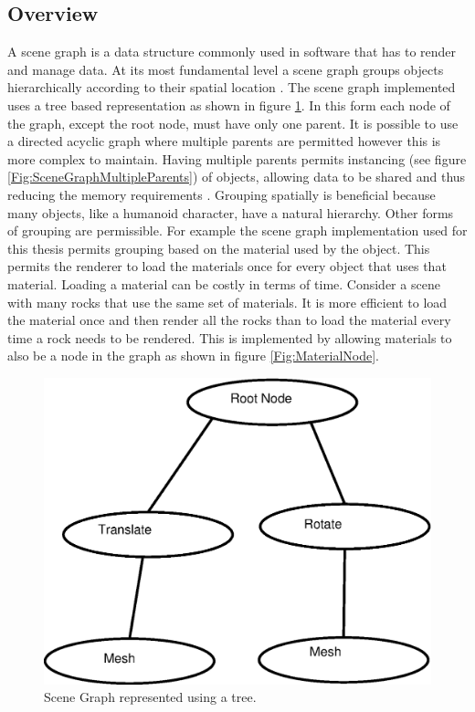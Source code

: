 \subsection{Overview}
A scene graph is a data structure commonly used in software that has to render
and manage data. At its most fundamental level a scene graph groups objects
hierarchically according to their spatial location \cite{Eberly}. The scene
graph implemented uses a tree based representation as shown in figure
\ref{Fig:SceneGraphTree}. In this form each node of the graph, except the root
node, must have only one parent. It is possible to use a directed acyclic graph
where multiple parents are permitted however this is more complex to maintain.
Having multiple parents permits instancing (see figure
\ref{Fig:SceneGraphMultipleParents}) of objects, allowing data to be
shared and thus reducing the memory requirements
\cite{DesigningAPCGameEngine}. Grouping spatially is beneficial because many
objects, like a humanoid character, have a natural hierarchy. Other forms of
grouping are permissible. For example the scene graph implementation used for
this thesis permits grouping based on the material used by the object.  This
permits the renderer to load the materials once for every object that uses that
material. Loading a material can be costly in terms of time. Consider a scene
with many rocks that use the same set of materials.  It is more efficient to
load the material once and then render all the rocks than to load the material
every time a rock needs to be rendered. This is implemented by allowing
materials to also be a node in the graph as shown in figure
\ref{Fig:MaterialNode}.

\begin{figure}
    \centering
    \includegraphics[height=0.3\textheight]{SceneGraphTree}
    \caption{\label{Fig:SceneGraphTree}Scene Graph represented using a tree.}
\end{figure}

